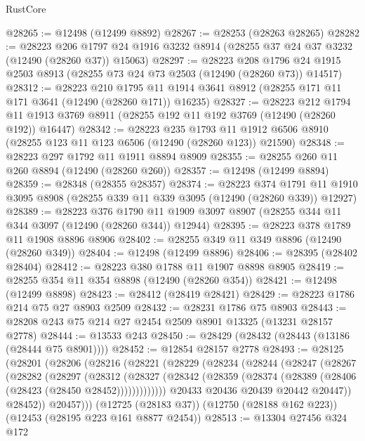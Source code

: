 \begin{lexlean}{RustCore}
\begin{coremodule}
@28265 := @12498 (@12499 @8892)
@28267 := @28253 (@28263 @28265)
@28282 := @28223
    @206
    @1797
    @24
    @1916
    @3232
    @8914
    (@28255 @37 @24 @37 @3232 (@12490 (@28260 @37)) @15063)
@28297 := @28223
    @208
    @1796
    @24
    @1915
    @2503
    @8913
    (@28255 @73 @24 @73 @2503 (@12490 (@28260 @73)) @14517)
@28312 := @28223
    @210
    @1795
    @11
    @1914
    @3641
    @8912
    (@28255 @171 @11 @171 @3641 (@12490 (@28260 @171)) @16235)
@28327 := @28223
    @212
    @1794
    @11
    @1913
    @3769
    @8911
    (@28255 @192 @11 @192 @3769 (@12490 (@28260 @192)) @16447)
@28342 := @28223
    @235
    @1793
    @11
    @1912
    @6506
    @8910
    (@28255 @123 @11 @123 @6506 (@12490 (@28260 @123)) @21590)
@28348 := @28223 @297 @1792 @11 @1911 @8894 @8909
@28355 := @28255 @260 @11 @260 @8894 (@12490 (@28260 @260))
@28357 := @12498 (@12499 @8894)
@28359 := @28348 (@28355 @28357)
@28374 := @28223
    @374
    @1791
    @11
    @1910
    @3095
    @8908
    (@28255 @339 @11 @339 @3095 (@12490 (@28260 @339)) @12927)
@28389 := @28223
    @376
    @1790
    @11
    @1909
    @3097
    @8907
    (@28255 @344 @11 @344 @3097 (@12490 (@28260 @344)) @12944)
@28395 := @28223 @378 @1789 @11 @1908 @8896 @8906
@28402 := @28255 @349 @11 @349 @8896 (@12490 (@28260 @349))
@28404 := @12498 (@12499 @8896)
@28406 := @28395 (@28402 @28404)
@28412 := @28223 @380 @1788 @11 @1907 @8898 @8905
@28419 := @28255 @354 @11 @354 @8898 (@12490 (@28260 @354))
@28421 := @12498 (@12499 @8898)
@28423 := @28412 (@28419 @28421)
@28429 := @28223 @1786 @214 @75 @27 @8903 @2509
@28432 := @28231 @1786 @75 @8903
@28443 := @28208 @243 @75 @214 @27 @2454 @2509 @8901 @13325 (@13231 @28157 @2778)
@28444 := @13533 @243
@28450 := @28429 (@28432 (@28443 (@13186 (@28444 @75 @8901))))
@28452 := @12854 @28157 @2778
@28493 := @28125
    (@28201
      (@28206
        (@28216
          (@28221
            (@28229
              (@28234
                (@28244
                  (@28247
                    (@28267
                      (@28282
                        (@28297
                          (@28312
                            (@28327
                              (@28342
                                (@28359 (@28374 (@28389 (@28406 (@28423 (@28450 @28452)))))))))))))
                  @20433
                  @20436
                  @20439
                  @20442
                  @20447))
              @28452))
          @20457)))
    (@12725 (@28183 @37))
    (@12750 (@28188 @162 @223))
    (@12453 (@28195 @223 @161 @8877 @2454))
@28513 := @13304
    @27456
    @324
    @172

\end{coremodule}
\end{lexlean}

